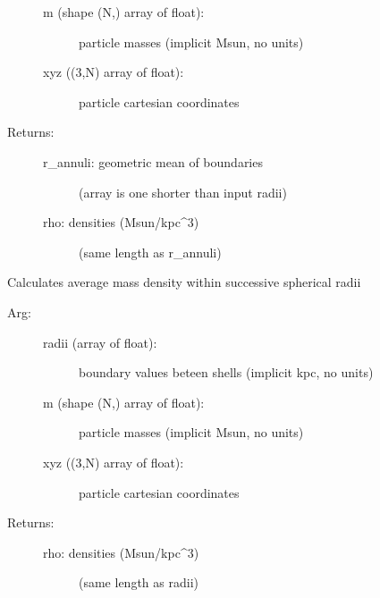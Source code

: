 \documentclass[letterpaper,10pt,english]{sphinxmanual}
\begin{document}
\begin{fulllineitems}
\begin{fulllineitems}
\begin{description}
\begin{description}
\item[{m (shape (N,) array of float):}] \leavevmode
particle masses (implicit Msun, no units)

\item[{xyz ((3,N) array of float):}] \leavevmode
particle cartesian coordinates

\end{description}

\item[{Returns:}] \leavevmode\begin{description}
\item[{r\_annuli: geometric mean of boundaries }] \leavevmode
(array is one shorter than input radii)

\item[{rho: densities (Msun/kpc\textasciicircum{}3)}] \leavevmode
(same length as r\_annuli)

\end{description}

\end{description}

\end{fulllineitems}


\begin{fulllineitems}
\label{\detokenize{massprofile:galaxy.massprofile.MassProfile.density_profile_sphere}}
Calculates average mass density within successive spherical radii
\begin{description}
\item[{Arg:}] \leavevmode\begin{description}
\item[{radii (array of float):}] \leavevmode
boundary values beteen shells (implicit kpc, no units)

\item[{m (shape (N,) array of float):}] \leavevmode
particle masses (implicit Msun, no units)

\item[{xyz ((3,N) array of float):}] \leavevmode
particle cartesian coordinates

\end{description}

\item[{Returns:}] \leavevmode\begin{description}
\item[{rho: densities (Msun/kpc\textasciicircum{}3)}] \leavevmode
(same length as radii)


\end{description}
\end{description}
\end{fulllineitems}
\end{fulllineitems}
\end{document}
